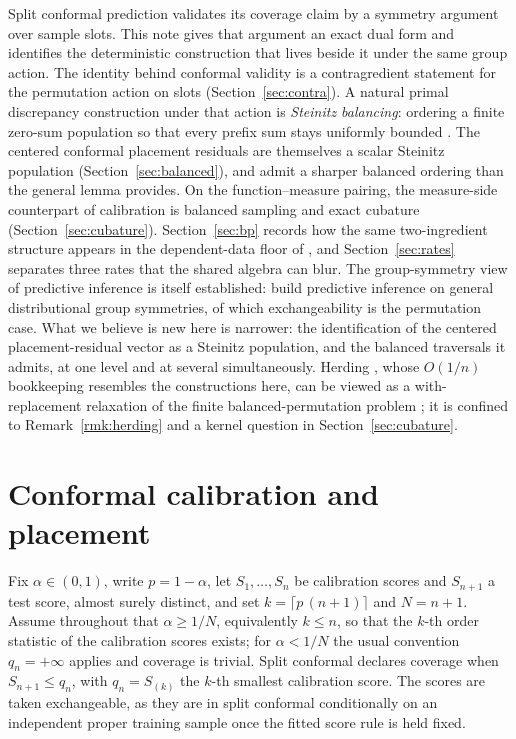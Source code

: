 \documentclass[11pt]{article}
\theoremstyle{remark}
\begin{document}
Split conformal prediction validates its coverage claim by a symmetry argument over sample
slots. This note gives that argument an exact dual form and identifies the deterministic
construction that lives beside it under the same group action. The identity behind conformal
validity is a contragredient statement for the permutation action on slots
(Section~\ref{sec:contra}). A natural primal discrepancy construction under that action is
\emph{Steinitz balancing}: ordering a finite zero-sum population so that every prefix sum stays
uniformly bounded \citep{steinitz1913}. The centered conformal placement residuals are
themselves a scalar Steinitz population (Section~\ref{sec:balanced}), and admit a sharper balanced ordering than the general
lemma provides. On the function--measure pairing, the measure-side counterpart of calibration
is balanced sampling and exact cubature (Section~\ref{sec:cubature}). Section~\ref{sec:bp}
records how the same two-ingredient structure appears in the dependent-data floor of
\citet{barberpananjady2026}, and Section~\ref{sec:rates} separates three rates that the shared
algebra can blur. The group-symmetry view of predictive inference is itself established:
\citet{dobriban2025symmpi} build predictive inference on general distributional group
symmetries, of which exchangeability is the permutation case. What we believe is new here is
narrower: the identification of the centered placement-residual vector as a Steinitz
population, and
the balanced traversals it admits, at one level and at several simultaneously. Herding \citep{welling2009}, whose $O(1/n)$ bookkeeping
resembles the constructions here, can be viewed as a with-replacement relaxation of the
finite balanced-permutation problem \citep{harvey2014}; it is confined to
Remark~\ref{rmk:herding} and a kernel question in Section~\ref{sec:cubature}.

\section{Conformal calibration and placement}\label{sec:conformal}

Fix $\alpha\in(0,1)$, write $p=1-\alpha$, let $S_1,\dots,S_n$ be calibration scores and
$S_{n+1}$ a test score, almost surely distinct, and set $k=\lceil p\,(n+1)\rceil$ and $N=n+1$.
Assume throughout that $\alpha\ge 1/N$, equivalently $k\le n$, so that the $k$-th order
statistic of the calibration scores exists; for $\alpha<1/N$ the usual convention
$q_n=+\infty$ applies and coverage is trivial. Split conformal declares coverage when
$S_{n+1}\le q_n$, with $q_n=S_{(k)}$ the $k$-th smallest calibration score. The scores are
taken exchangeable, as they are in split conformal conditionally on an independent proper
training sample once the fitted score rule is held fixed.
\end{document}

